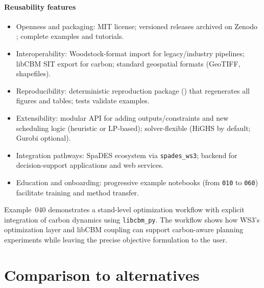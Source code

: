 \documentclass[review]{elsarticle}
\begin{document}
\paragraph{Reusability features}
\begin{itemize}
  \item Openness and packaging: MIT license; versioned releases archived on Zenodo \citep{ws3_zenodo2025}; complete examples and tutorials.
  \item Interoperability: Woodstock-format import for legacy/industry pipelines; libCBM SIT export for carbon; standard geospatial formats (GeoTIFF, shapefiles).
  \item Reproducibility: deterministic reproduction package () that regenerates all figures and tables; tests validate examples.
  \item Extensibility: modular API for adding outputs/constraints and new scheduling logic (heuristic or LP-based); solver-flexible (HiGHS by default; Gurobi optional).
  \item Integration pathways: SpaDES ecosystem via \texttt{spades\_ws3}; backend for decision-support applications and web services.
  \item Education and onboarding: progressive example notebooks (from \texttt{010} to \texttt{060}) facilitate training and method transfer.
\end{itemize}

Example~040 demonstrates a stand-level optimization workflow with explicit integration of carbon dynamics using \texttt{libcbm\_py}. The workflow shows how WS3’s optimization layer and libCBM coupling can support carbon-aware planning experiments while leaving the precise objective formulation to the user.

\section{Comparison to alternatives}
\end{document}
